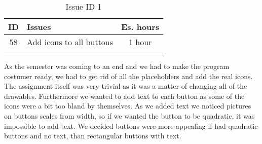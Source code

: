 \begin{longtable} { | c | p{12cm} | c | } 
\hline
	ID 	&	Issues	&		 Es. hours \\\hline
	58	&	Add icons to all buttons	&	1 hour	\\\hline
\caption{Issue ID 1}
\label{tab:spr4_iconstobuttons}
\end{longtable}

As the semester was coming to an end and we had to make the program costumer ready, we had to get rid of all the placeholders and add the real icons. The assignment itself was very trivial as it was a matter of changing all of the drawables. Furthermore we wanted to add text to each button as some of the icons were a bit too bland by themselves. As we added text we noticed pictures on buttons scales from width, so if we wanted the button to be quadratic, it was impossible to add text. We decided buttons were more appealing if had quadratic buttons and no text, than rectangular buttons with text.